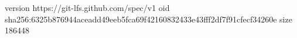 version https://git-lfs.github.com/spec/v1
oid sha256:6325b876944aceadd49eeb5fca69f42160832433e43fff2df7f91cfecf34260e
size 186448
